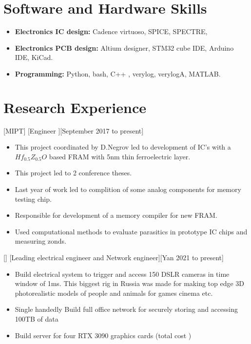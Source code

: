 \documentclass{article}
\begin{document}
\section{Software and Hardware Skills}
\begin{itemize}
\item \textbf{Electronics IC design:} Cadence virtuoso, SPICE, SPECTRE,
\item \textbf{Electronics PCB design:} Altium designer, STM32 cube IDE, Arduino IDE, KiCad.
\item \textbf{Programming:} Python, bash, C++ , verylog, verylogA, MATLAB.
\end{itemize}

\section{Research Experience}

[MIPT]
[Engineer ][September 2017 to present]

\begin{itemize}
\item This project coordinated by D.Negrov led to development of IC's with a $Hf_{0.5} Z_{0.5} O $ based  FRAM with 5nm thin ferroelectric layer.
\item This project led to 2 conference theses.
\item Last year of work led to complition of some analog components for memory testing chip.
\item Responsible for development of a memory compiler for new FRAM. 
\item Used computational methods to evaluate parasitics in prototype IC chips and measuring zonds.

\end{itemize}

[]
[Leading electrical engineer and Network engineer][Yan 2021 to present]

\begin{itemize}
    \item Build electrical system to trigger and access 150 DSLR cameras in time window of 1ms. This biggest rig in Russia was made for making top edge 3D photorealistic models of people and animals for games cinema etc.
    \item Single handedly Build full office network for securely storing and accessing 100TB of data 
    \item Build server for four RTX 3090 graphics cards (total cost )
    
    \end{itemize}
\end{document}
